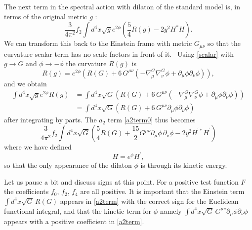 \documentclass[12pt]{article}%
\begin{document}
The next term in the spectral action with dilaton of the standard model is, in
terms of the original metric $g$ :
\begin{equation}
\frac{3}{4\pi^{2}}f_{2}\int d^{4}x\sqrt{g}e^{2\phi}\left(  \frac{5}{4}R\left(
g\right)  -2y^{2}H^{\ast}H\right)  . \label{a2term0}%
\end{equation}
We can transform this back to the Einstein frame with metric $G_{\mu\nu}$ so
that the curvature scalar term has no scale factors in front of it. \ Using
\eqref{scalar} with $g\rightarrow G$ and $\phi\rightarrow-\phi$ the curvature
$R\left(  g\right)  $ is
\[
R\left(  g\right)  =e^{2\phi}\left(  R\left(  G\right)  +6\,G^{\mu\nu}\left(
-\nabla_{\mu}^{G}\nabla_{\nu}^{G}\phi+\partial_{\mu}\phi\partial_{\nu}%
\phi\right)  \right)  ,
\]
and we obtain
\begin{align*}
\int d^{4}x\sqrt{g}e^{2\phi}R\left(  g\right)   &  =\int d^{4}x\sqrt{G}\left(
R\left(  G\right)  +6\,G^{\mu\nu}\left(  -\nabla_{\mu}^{G}\nabla_{\nu}^{G}%
\phi+\partial_{\mu}\phi\partial_{\nu}\phi\right)  \right) \\
&  =\int d^{4}x\sqrt{G}\left(  R\left(  G\right)  +6\,G^{\mu\nu}\partial_{\mu
}\phi\partial_{\nu}\phi\right)
\end{align*}
after integrating by parts. The $a_{2}$ term \eqref{a2term0} thus becomes
\begin{equation}
\frac{3}{4\pi^{2}}f_{2}\int d^{4}x\sqrt{G}\left(  \frac{5}{4}R\left(
G\right)  +\frac{15}{2}G^{\mu\nu}\partial_{\mu}\phi\,\partial_{\nu}\phi
-2y^{2}H^{^{\prime}\ast}H^{^{\prime}}\right)  \label{a2term}%
\end{equation}
where we have defined
\[
H=e^{\phi}H^{\prime},
\]
so that the only appearance of the dilaton $\phi$ is through its kinetic energy.

Let us pause a bit and discuss signs at this point. For a positive test
function $F$ the coefficients $f_{0}$, $f_{2}$, $f_{4}$ are all positive. It
is important that the Einstein term $\int d^{4}x\sqrt{G}\,R\left(  G\right)  $
appears in \eqref{a2term} with the correct sign for the Euclidean functional
integral, and that the kinetic term for $\phi$ namely $\int d^{4}x\sqrt
{G}\,G^{\mu\nu}\partial_{\mu}\phi\partial_{\nu}\phi$ appears with a positive
coefficient in \eqref{a2term}.
\end{document}
